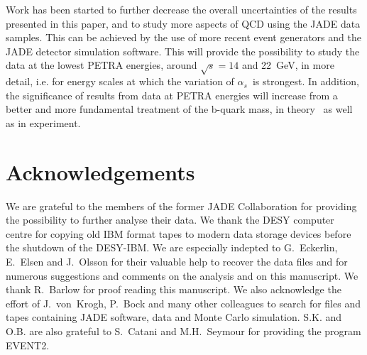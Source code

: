 \documentclass[12pt,a4paper,twoside]{article}
\newcommand{\as}     {\ensuremath{\alpha_s}}
\begin{document}
Work has been started to further decrease the overall uncertainties of
the results presented in this paper, and to study more aspects of QCD
using the JADE data samples.
This can be achieved by the use of more recent event generators
and the JADE detector simulation software.
This will provide the possibility to study the data at the
lowest PETRA energies, around $\sqrt{s} = 14$ and 22~GeV, in more detail,
i.e. for energy scales at which the variation of \as\ is strongest.
In addition, the significance of results from data at PETRA energies
will increase from a better and more fundamental treatment of the
b-quark mass, in theory~\cite{bib-NLO-quark-mass} as well as in experiment.


\medskip
\bigskip\bigskip\bigskip
\appendix
\par
\section*{Acknowledgements}
\par
We are grateful to the members of the former JADE Collaboration 
for providing the possibility to further analyse their data. 
We thank the DESY computer centre for copying old IBM format tapes 
to modern data storage devices before the shutdown of the DESY-IBM. 
We are especially indepted to G.~Eckerlin, E.~Elsen and J.~Olsson for
their valuable help to recover the data files and for numerous
suggestions and comments on the analysis and on this manuscript.
We thank R.~Barlow for proof reading this manuscript.
We also acknowledge the 
effort of J.~von~Krogh, P.~Bock and many other colleagues to search for 
files and tapes containing JADE software, data and Monte Carlo simulation.
S.K. and O.B. are also grateful to S.~Catani and M.H.~Seymour for providing
the program EVENT2.

\newpage
\end{document}

